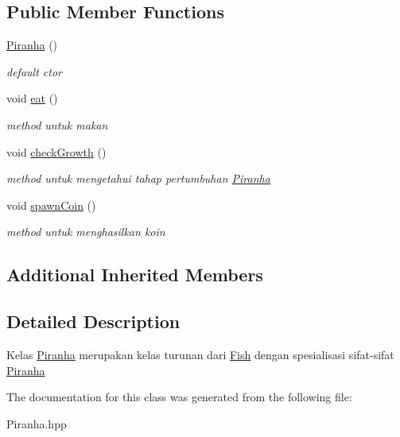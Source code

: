 \subsection*{Public Member Functions}
\begin{DoxyCompactItemize}
\item 
\mbox{\label{classPiranha_a7e3a4c5c7f458c16717c8cb997fc0331}} 
\hyperlink{classPiranha_a7e3a4c5c7f458c16717c8cb997fc0331}{Piranha} ()
\begin{DoxyCompactList}\small\item\em default ctor \end{DoxyCompactList}\item 
\mbox{\label{classPiranha_ac48c0256edd56c427b3d82f6e0d4df82}} 
void \hyperlink{classPiranha_ac48c0256edd56c427b3d82f6e0d4df82}{eat} ()
\begin{DoxyCompactList}\small\item\em method untuk makan \end{DoxyCompactList}\item 
\mbox{\label{classPiranha_ad35beb897ca7281e3792faf8211e39a3}} 
void \hyperlink{classPiranha_ad35beb897ca7281e3792faf8211e39a3}{check\+Growth} ()
\begin{DoxyCompactList}\small\item\em method untuk mengetahui tahap pertumbuhan \hyperlink{classPiranha}{Piranha} \end{DoxyCompactList}\item 
\mbox{\label{classPiranha_ad17da28a5556a91170fb6bfe4e331b82}} 
void \hyperlink{classPiranha_ad17da28a5556a91170fb6bfe4e331b82}{spawn\+Coin} ()
\begin{DoxyCompactList}\small\item\em method untuk menghasilkan koin \end{DoxyCompactList}\end{DoxyCompactItemize}
\subsection*{Additional Inherited Members}


\subsection{Detailed Description}
Kelas \hyperlink{classPiranha}{Piranha} merupakan kelas turunan dari \hyperlink{classFish}{Fish} dengan spesialisasi sifat-\/sifat \hyperlink{classPiranha}{Piranha} 

The documentation for this class was generated from the following file\+:\begin{DoxyCompactItemize}
\item 
Piranha.\+hpp\end{DoxyCompactItemize}
